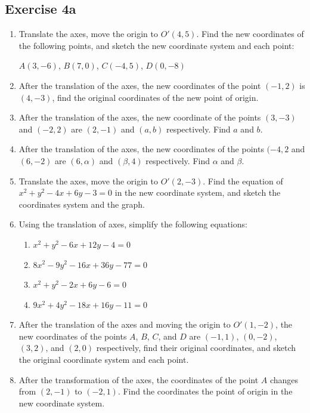 \documentclass{report}
\begin{document}
\newpage
\subsection*{Exercise 4a}
\begin{enumerate}[leftmargin=*]
    \item Translate the axes, move the origin to $O'(4, 5)$. Find the new coordinates of
          the following points, and sketch the new coordinate system and each point:

          $A(3, -6)$, $B(7, 0)$, $C(-4, 5)$, $D(0, -8)$
    \item After the translation of the axes, the new coordinates of the point $(-1, 2)$
          is $(4, -3)$, find the original coordinates of the new point of origin.
    \item After the translation of the axes, the new coordinate of the points $(3, -3)$
          and $(-2, 2)$ are $(2, -1)$ and $(a, b)$ respectively. Find $a$ and $b$.
    \item After the translation of the axes, the new coordinates of the points $(-4, 2$
          and $(6, -2)$ are $(6, \alpha)$ and $(\beta, 4)$ respectively. Find $\alpha$
          and $\beta$.
    \item Translate the axes, move the origin to $O'(2, -3)$. Find the equation of $x^2 +
              y^2 - 4x + 6y - 3 = 0$ in the new coordinate system, and sketch the coordinates
          system and the graph.
    \item Using the translation of axes, simplify the following equations:
          \begin{enumerate}
              \item $x^2 + y^2 - 6x + 12y - 4 = 0$
              \item $8x^2 - 9y^2 - 16x + 36y - 77 = 0$
              \item $x^2 + y^2 - 2x + 6y - 6 = 0$
              \item $9x^2 + 4y^2 - 18x + 16y - 11 = 0$
          \end{enumerate}
    \item After the translation of the axes and moving the origin to $O'(1, -2)$, the new
          coordinates of the points $A$, $B$, $C$, and $D$ are $(-1, 1)$, $(0, -2)$, $(3,
              2)$, and $(2, 0)$ respectively, find their original coordinates, and sketch the
          original coordinate system and each point.
    \item After the transformation of the axes, the coordinates of the point $A$ changes
          from $(2, -1)$ to $(-2, 1)$. Find the coordinates the point of origin in the
          new coordinate system.
\end{enumerate}
\end{document}
